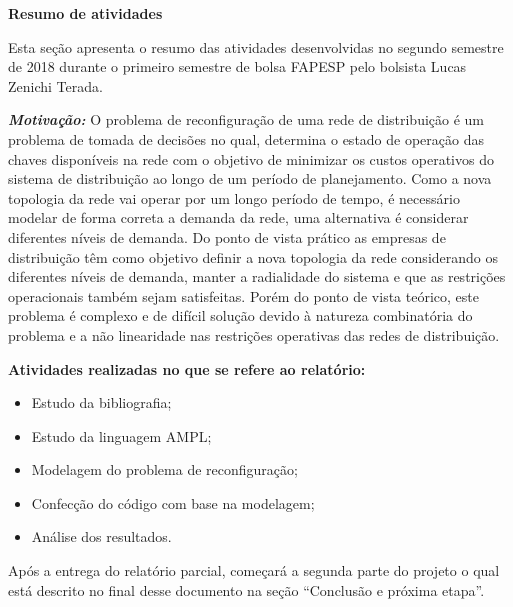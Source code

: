 \begin{center}
    \textbf{Resumo de atividades}
\end{center}

Esta seção apresenta o resumo das atividades desenvolvidas no segundo semestre de 2018 durante o primeiro semestre de bolsa FAPESP pelo bolsista Lucas Zenichi Terada.

\textbf{\emph{Motivação:}} O problema de reconfiguração de uma rede de distribuição é um problema de tomada de decisões no qual, determina o estado de operação das chaves disponíveis na rede com o objetivo de minimizar os custos operativos do sistema de distribuição ao longo de um período de planejamento.
Como a nova topologia da rede vai operar por um longo período de tempo, é necessário modelar de forma correta a demanda da rede, uma alternativa é considerar diferentes níveis de demanda. 
Do ponto de vista prático as empresas de distribuição têm como objetivo definir a nova topologia da rede considerando os diferentes níveis de demanda, manter a radialidade do sistema e que as restrições operacionais também sejam satisfeitas. 
Porém do ponto de vista teórico, este problema é complexo e de difícil solução devido à natureza combinatória do problema e a não linearidade nas restrições operativas das redes de distribuição.

\textbf{Atividades realizadas no que se refere ao relatório:}

\begin{itemize}
    \item Estudo da bibliografia;
    
    \item Estudo da linguagem AMPL;
    
    \item Modelagem do problema de reconfiguração;
    
    \item Confecção do código com base na modelagem;
    
    \item Análise dos resultados.
\end{itemize}

Após a entrega do relatório parcial, começará a segunda parte do projeto o qual está descrito no final desse documento na seção ``Conclusão e próxima etapa''.


